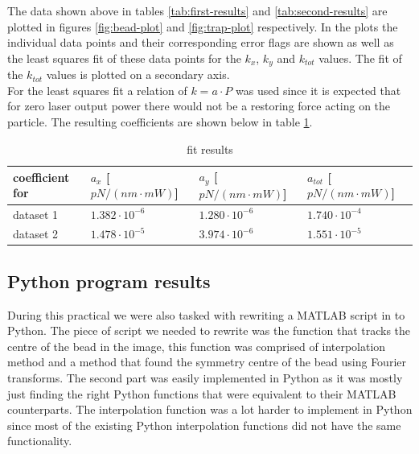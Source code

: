The data shown above in tables \ref{tab:first-results} and \ref{tab:second-results} are plotted in figures \ref{fig:bead-plot} and \ref{fig:trap-plot} re\-spectively. In the plots the in\-divi\-dual data points and their cor\-responding error flags are shown as well as the least squares fit of these data points for the $k_x$, $k_y$ and $k_{tot}$ values. The fit of the $k_{tot}$ values is plotted on a secondary axis.\\
For the least squares fit a relation of $k=a \cdot P$ was used since it is expected that for zero laser output power there would not be a restoring force acting on the particle. The resulting coefficients are shown below in table \ref{tab:fit-results}.\\

\vspace{-0.5cm}
\begin{table}[h!]
    \centering
    \begin{tabular}{|l|l|l|l|}
        \hline
        coefficient for & $a_x$ {[}$pN/(nm\cdot mW)${]} & $a_y$ {[}$pN/(nm \cdot mW)${]} & $a_{tot}$ {[}$pN/(nm \cdot mW)${]} \\ \hline
        dataset 1       & $1.382\cdot 10^{-6}$          & $1.280 \cdot 10^{-6}$          & $1.740 \cdot 10^{-4}$              \\ \hline
        dataset 2       & $1.478 \cdot 10^{-5}$         & $3.974 \cdot 10^{-6}$          & $1.551 \cdot 10^{-5}$              \\ \hline
    \end{tabular}
    \caption{fit results}
    \label{tab:fit-results}
\end{table}

\clearpage{}
\subsection{Python program results}
During this practical we were also tasked with rewriting a MATLAB script in to Python. The piece of script we needed to rewrite was the function that tracks the centre of the bead in the image, this function was comprised of interpolation method and a method that found the symmetry centre of the bead using Fourier transforms. The second part was easily implemented in Python as it was mostly just finding the right Python functions that were equivalent to their MATLAB counterparts. The interpolation function was a lot harder to implement in Python since most of the existing Python interpolation functions did not have the same functionality.\\

